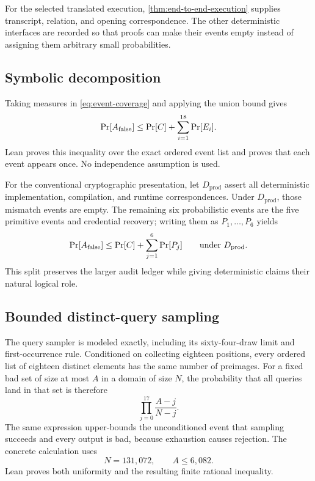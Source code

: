 For the selected translated execution, \cref{thm:end-to-end-execution}
supplies transcript, relation, and opening correspondence.  The other
deterministic interfaces are recorded so that proofs can make their events
empty instead of assigning them arbitrary small probabilities.

\subsection{Symbolic decomposition}

Taking measures in \cref{eq:event-coverage} and applying the union bound gives
\begin{equation}
  \Pr[A_{\mathrm{false}}]
  \leq \Pr[C]+\sum_{i=1}^{18}\Pr[E_i].
  \label{eq:symbolic-union}
\end{equation}
Lean proves this inequality over the exact ordered event list and proves that
each event appears once.  No independence assumption is used.

For the conventional cryptographic presentation, let
\(D_{\mathrm{prod}}\) assert all deterministic implementation, compilation,
and runtime correspondences.  Under \(D_{\mathrm{prod}}\), those mismatch
events are empty.  The remaining six probabilistic events are the five
primitive events and credential recovery; writing them as
\(P_1,\ldots,P_6\) yields
\begin{equation}
  \Pr[A_{\mathrm{false}}]
  \leq \Pr[C]+\sum_{j=1}^{6}\Pr[P_j]
  \qquad\text{under }D_{\mathrm{prod}}.
  \label{eq:deterministic-probabilistic-split}
\end{equation}
This split preserves the larger audit ledger while giving deterministic
claims their natural logical role.

\subsection{Bounded distinct-query sampling}

The query sampler is modeled exactly, including its sixty-four-draw limit and
first-occurrence rule.  Conditioned on collecting eighteen positions, every
ordered list of eighteen distinct elements has the same number of preimages.
For a fixed bad set of size at most \(A\) in a domain of size \(N\), the
probability that all queries land in that set is therefore
\begin{equation}
  \prod_{j=0}^{17}\frac{A-j}{N-j}.
  \label{eq:without-replacement}
\end{equation}
The same expression upper-bounds the unconditioned event that sampling
succeeds and every output is bad, because exhaustion causes rejection.  The
concrete calculation uses
\[
  N=131{,}072,
  \qquad A\leq6{,}082.
\]
Lean proves both uniformity and the resulting finite rational inequality.

